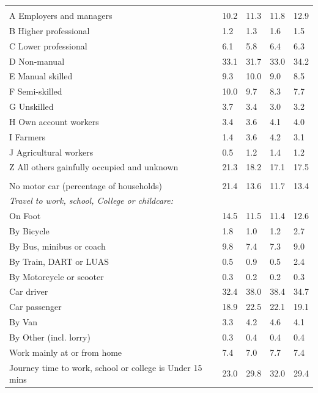 \documentclass{article}
\begin{document}
\begin{table}[h]
\begin{tabular}{KTTTT}
\hline
    \\ 
    \hline
A Employers and managers & 10.2& 11.3& 11.8& 12.9\\
B Higher professional & 1.2& 1.3& 1.6& 1.5\\
C Lower professional & 6.1& 5.8& 6.4& 6.3\\
D Non-manual & 33.1& 31.7& 33.0& 34.2\\
E Manual skilled &  9.3& 10.0&  9.0&  8.5\\
F Semi-skilled & 10.0&  9.7&  8.3&  7.7\\
G Unskilled & 3.7& 3.4& 3.0& 3.2\\
H Own account workers & 3.4& 3.6& 4.1& 4.0\\
I Farmers & 1.4& 3.6& 4.2& 3.1\\
J Agricultural workers & 0.5& 1.2& 1.4& 1.2\\
Z All others gainfully occupied and unknown & 21.3& 18.2& 17.1& 17.5\\
\hline
{}\hline
    \\ 
    \hline
No motor car (percentage of households) & 21.4& 13.6& 11.7& 
13.4\\
    \hline 
\emph{Travel to work, school, College or childcare:} & & & \\
\quad On Foot & 14.5& 11.5& 11.4& 12.6\\ 
\quad By Bicycle & 1.8& 1.0& 1.2& 2.7\\ 
\quad By Bus, minibus or coach & 9.8& 7.4& 7.3& 9.0\\
\quad By Train, DART or LUAS & 0.5& 0.9& 0.5& 2.4\\
\quad By Motorcycle or scooter & 0.3& 0.2& 0.2& 0.3\\
\quad Car driver & 32.4 & 38.0& 38.4& 34.7\\
\quad Car passenger & 18.9& 22.5& 22.1& 19.1\\
\quad By Van & 3.3& 4.2& 4.6& 4.1\\
\quad By Other (incl. lorry) & 0.3& 0.4& 0.4& 0.4\\
    \hline
Work mainly at or from home & 7.4& 7.0& 7.7& 7.4\\
Journey time to work, school or college is Under 15 mins & 23.0& 29.8& 32.0& 29.4\\

\end{tabular}
\end{table}
\end{document}
